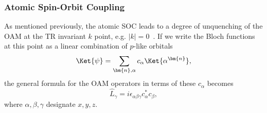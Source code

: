 \subsubsection{Atomic Spin-Orbit Coupling}
As mentioned previously, the atomic SOC leads to a degree of unquenching of the OAM at the TR invariant $k$ point, e.g. $|k|=0$~\cite{Park2011,Park2012,Park2015}.
If we write the Bloch functions at this point as a linear combination of $p$-like orbitals
\begin{equation}
\Ket{\psi} = \sum_{\bm{n},\alpha} c_\alpha \Ket{\alpha^{\bm{n}}},
\end{equation}
the general formula for the OAM operators in terms of these $c_\alpha$ becomes
\begin{equation}
	\hat{L}_{\gamma}= i \epsilon_{\alpha \beta \gamma} c^*_\alpha c_\beta,
\end{equation}
where $\alpha,\beta,\gamma$ designate $x,y,z$.


